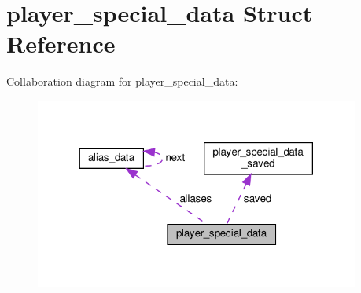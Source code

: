 \hypertarget{structplayer__special__data}{}\section{player\+\_\+special\+\_\+data Struct Reference}
\label{structplayer__special__data}


Collaboration diagram for player\+\_\+special\+\_\+data\+:\nopagebreak
\begin{figure}[H]
\begin{center}
\leavevmode
\includegraphics[width=302pt]{structplayer__special__data__coll__graph}
\end{center}
\end{figure}

